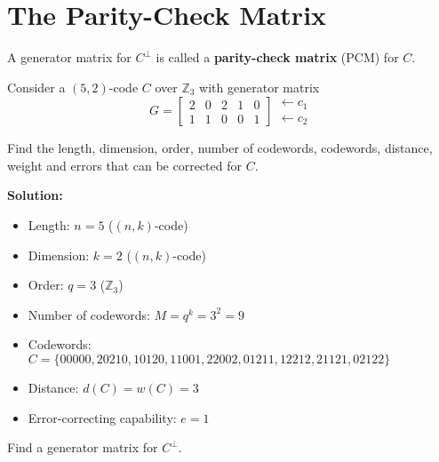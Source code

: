 \section{The Parity-Check Matrix}

\begin{defbox}
    \begin{definition}
        A generator matrix for $ C^{\perp} $ is called a \textbf{parity-check matrix}
        (PCM) for $ C $.
    \end{definition} \end{defbox}

\begin{exbox}
    \begin{example}
    Consider a $ (5,2) $-code $ C $ over $ \mathbb{Z}_3 $ with generator matrix
    \[ G=
        \begin{bmatrix}
            2 & 0 & 2 & 1 & 0 \\
            1 & 1 & 0 & 0 & 1
        \end{bmatrix}
        \begin{matrix}
            \leftarrow c_1 \\
            \leftarrow c_2
        \end{matrix} \]

    Find the length, dimension, order, number of codewords, codewords,
    distance, weight and errors that can be corrected for $ C $.

    \textbf{Solution:}
    \begin{itemize}
        \item Length: $ n=5 $ ($ (n,k) $-code)
        \item Dimension: $ k=2 $ ($ (n,k) $-code)
        \item Order: $ q=3 $ ($ \mathbb{Z}_3 $)
        \item Number of codewords: $ M=q^k=3^2=9 $
        \item Codewords: $ C=\{00000,20210,10120,11001,22002,01211,12212,21121,02122\} $
        \item Distance: $ d(C)=w(C)=3 $
        \item Error-correcting capability: $ e=1 $
    \end{itemize}

    Find a generator matrix for $ C^{\perp} $.


\end{example}
\end{exbox}
